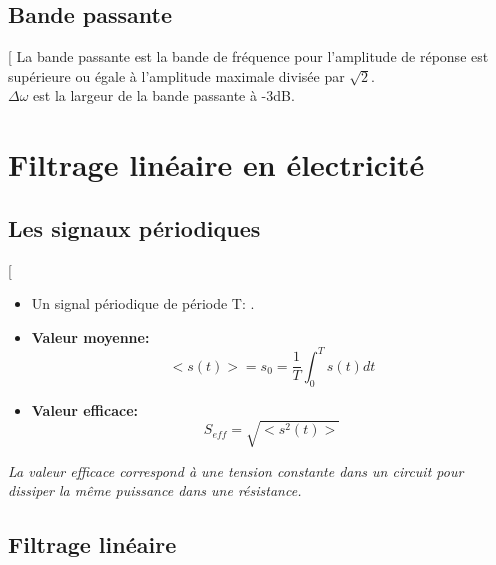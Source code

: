 \documentclass[12pt,hidelinks]{article}
\begin{document}
    \subsection{Bande passante}
    \begin{DashedDefinition}{}[
    La bande passante est la bande de fréquence pour l'amplitude de réponse est supérieure ou égale à l'amplitude maximale divisée par $\sqrt{2}$. \\
    $\Delta \omega$ est la largeur de la bande passante à -3dB.
    \end{DashedDefinition}
\newpage
\section{Filtrage linéaire en électricité}
\vspace{3cm}
    \subsection{Les signaux périodiques}
        \begin{DashedDefinition}{}[
            \begin{itemize}
                \item Un signal périodique de période T: .
                \item \textbf{Valeur moyenne:}
                \[<s(t)>=s_0=\frac{1}{T}\int_0^T s(t) dt\]
                \item \textbf{Valeur efficace:}
                \[S_{eff}=\sqrt{<s^2(t)>}\]
            \end{itemize}
            \textit{La valeur efficace correspond à une tension constante dans un circuit pour dissiper la même puissance dans une résistance.}
        \end{DashedDefinition}
        
    \subsection{Filtrage linéaire}
\end{document}
